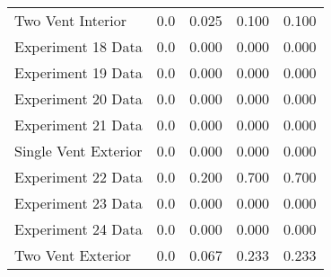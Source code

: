 \begin{tabular}{lrrrr}
Two Vent Interior    &       0.0 &            0.025 &            0.100 &      0.100 \\
Experiment 18 Data   &       0.0 &            0.000 &            0.000 &      0.000 \\
Experiment 19 Data   &       0.0 &            0.000 &            0.000 &      0.000 \\
Experiment 20 Data   &       0.0 &            0.000 &            0.000 &      0.000 \\
Experiment 21 Data   &       0.0 &            0.000 &            0.000 &      0.000 \\
Single Vent Exterior &       0.0 &            0.000 &            0.000 &      0.000 \\
Experiment 22 Data   &       0.0 &            0.200 &            0.700 &      0.700 \\
Experiment 23 Data   &       0.0 &            0.000 &            0.000 &      0.000 \\
Experiment 24 Data   &       0.0 &            0.000 &            0.000 &      0.000 \\
Two Vent Exterior    &       0.0 &            0.067 &            0.233 &      0.233 \\
\bottomrule
\end{tabular}
